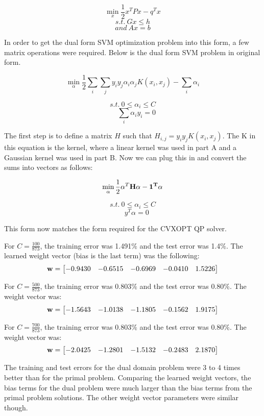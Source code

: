 \documentclass[12pt, fullpage,letterpaper]{article}
\begin{document}
\begin{enumerate}
\begin{enumerate}
	$$ \min_x \frac{1}{2} x^T P x - q^T x $$
	$$ {s.t.} \ Gx \le h $$
	$$ {and} \ Ax = b $$
	
	In order to get the dual form SVM optimization problem into this form, a few matrix operations were required. Below is the dual form SVM problem in original form.
	
	$$ \min_{\alpha} \frac{1}{2} \sum_i \sum_j y_i y_j \alpha_i \alpha_j K(x_i, x_j) - \sum_i \alpha_i $$

	$$s.t. \ 0 \le \alpha_i \le C $$
	$$ \ \ \ \ \ \sum_i \alpha_i y_i = 0 $$
	
	The first step is to define a matrix $H$ such that $H_{i,j} = y_i y_j K(x_i,x_j)$. The K in this equation is the kernel, where a linear kernel was used in part A and a Gaussian kernel was used in part B. Now we can plug this in and convert the sums into vectors as follows:
	
	$$ \min_{\alpha} \frac{1}{2} \alpha^T \bf H \alpha -  1^T \alpha $$

	$$s.t. \ 0 \le \alpha_i \le C $$
	$$ \ \ \ \ \ y^T \alpha = 0 $$
	
	This form now matches the form required for the CVXOPT QP solver. 
	
	For $C=\frac{100}{873}$, the training error was 1.491$\%$ and the test error was 1.4$\%$. The learned weight vector (bias is the last term) was the following:
	 $$ {\bf w} = \begin{bmatrix}\num{-0.9430} & \num{-0.6515} & \num{-0.6969} & \num{-0.0410} & \num{1.5226}\end{bmatrix} $$
	
	For $C=\frac{500}{873}$, the training error was 0.803$\%$ and the test error was 0.80$\%$. The weight vector was:
	$$ {\bf w} = \begin{bmatrix}\num{-1.5643} & \num{-1.0138} & \num{-1.1805} & \num{-0.1562} & \num{1.9175}\end{bmatrix} $$
	
	For $C=\frac{700}{873}$, the training error was 0.803$\%$ and the test error was 0.80$\%$. The weight vector was:
	$$ {\bf w} = \begin{bmatrix}\num{-2.0425} & \num{-1.2801} & \num{-1.5132} & \num{-0.2483} & \num{2.1870}\end{bmatrix} $$
	
	The training and test errors for the dual domain problem were 3 to 4 times better than for the primal problem. Comparing the learned weight vectors, the bias terms for the dual problem were much larger than the bias terms from the primal problem solutions. The other weight vector parameters were similar though.
	

\end{enumerate}
\end{enumerate}
\end{document}
